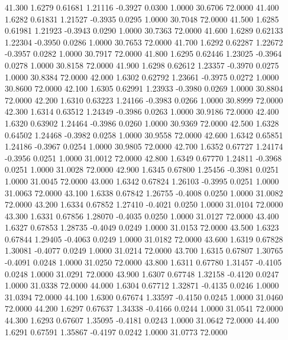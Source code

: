   41.300   1.6279   0.61681   1.21116  -0.3927   0.0300   1.0000  30.6706  72.0000
  41.400   1.6282   0.61831   1.21527  -0.3935   0.0295   1.0000  30.7048  72.0000
  41.500   1.6285   0.61981   1.21923  -0.3943   0.0290   1.0000  30.7363  72.0000
  41.600   1.6289   0.62133   1.22304  -0.3950   0.0286   1.0000  30.7653  72.0000
  41.700   1.6292   0.62287   1.22672  -0.3957   0.0282   1.0000  30.7917  72.0000
  41.800   1.6295   0.62446   1.23025  -0.3964   0.0278   1.0000  30.8158  72.0000
  41.900   1.6298   0.62612   1.23357  -0.3970   0.0275   1.0000  30.8384  72.0000
  42.000   1.6302   0.62792   1.23661  -0.3975   0.0272   1.0000  30.8600  72.0000
  42.100   1.6305   0.62991   1.23933  -0.3980   0.0269   1.0000  30.8804  72.0000
  42.200   1.6310   0.63223   1.24166  -0.3983   0.0266   1.0000  30.8999  72.0000
  42.300   1.6314   0.63512   1.24349  -0.3986   0.0263   1.0000  30.9186  72.0000
  42.400   1.6320   0.63902   1.24464  -0.3986   0.0260   1.0000  30.9369  72.0000
  42.500   1.6328   0.64502   1.24468  -0.3982   0.0258   1.0000  30.9558  72.0000
  42.600   1.6342   0.65851   1.24186  -0.3967   0.0254   1.0000  30.9805  72.0000
  42.700   1.6352   0.67727   1.24174  -0.3956   0.0251   1.0000  31.0012  72.0000
  42.800   1.6349   0.67770   1.24811  -0.3968   0.0251   1.0000  31.0028  72.0000
  42.900   1.6345   0.67800   1.25456  -0.3981   0.0251   1.0000  31.0045  72.0000
  43.000   1.6342   0.67824   1.26103  -0.3995   0.0251   1.0000  31.0063  72.0000
  43.100   1.6338   0.67842   1.26755  -0.4008   0.0250   1.0000  31.0082  72.0000
  43.200   1.6334   0.67852   1.27410  -0.4021   0.0250   1.0000  31.0104  72.0000
  43.300   1.6331   0.67856   1.28070  -0.4035   0.0250   1.0000  31.0127  72.0000
  43.400   1.6327   0.67853   1.28735  -0.4049   0.0249   1.0000  31.0153  72.0000
  43.500   1.6323   0.67844   1.29405  -0.4063   0.0249   1.0000  31.0182  72.0000
  43.600   1.6319   0.67828   1.30081  -0.4077   0.0249   1.0000  31.0214  72.0000
  43.700   1.6315   0.67807   1.30765  -0.4091   0.0248   1.0000  31.0250  72.0000
  43.800   1.6311   0.67780   1.31457  -0.4105   0.0248   1.0000  31.0291  72.0000
  43.900   1.6307   0.67748   1.32158  -0.4120   0.0247   1.0000  31.0338  72.0000
  44.000   1.6304   0.67712   1.32871  -0.4135   0.0246   1.0000  31.0394  72.0000
  44.100   1.6300   0.67674   1.33597  -0.4150   0.0245   1.0000  31.0460  72.0000
  44.200   1.6297   0.67637   1.34338  -0.4166   0.0244   1.0000  31.0541  72.0000
  44.300   1.6293   0.67607   1.35095  -0.4181   0.0243   1.0000  31.0642  72.0000
  44.400   1.6291   0.67591   1.35867  -0.4197   0.0242   1.0000  31.0773  72.0000
